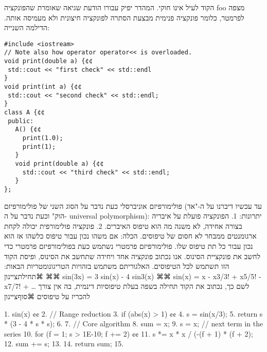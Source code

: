       הקוד לעיל אינו חוקי. המהדר יפיק עבורו הודעת שגיאה שאומרת שהפונקציה foo מצפה לפרמטר, כלומר פונקציה פנימית מבצעת הסתרה לפונקציה חיצונית ולא מעמיסה אותה.
      הדילמה השנייה:
\begin{verbatim}
#include <iostream>
// Note also how operator operator<< is overloaded.
void print(double a) {¢¢
 std::cout << "first check" << std::endl
}
void print(int a) {¢¢
 std::cout << "second check" << std::endl;
}
class A {¢¢
 public:
   A() {¢¢
     print(1.0);
     print(1);
   }
   void print(double a) {¢¢
     std::cout << "third check" << std::endl;
   }
};
\end{verbatim}

      פולימורפיזם אוניברסלי
      כעת נדבר על הסוג השני של פולימורפיזם (עד עכשיו דיברנו על ה-"אד הוק" וכעת נדבר על ה- universal polymorphism):
      יתרונות:
      1. הפונקציה פועלת על איבריה בצורה אחידה, לא משנה מה הוא טיפוס האיברים.
      2. פונקציה פולימורפית יכולה לקחת ארגומנטים ממבחר לא חסום של טיפוסים.
      הכלה:
      אם משהו נכון עבור טיפוס כלשהו אז הוא נכון עבור כל תת טיפוס שלו.
      פולימורפיזם פרמטרי
      נשתמש כעת בפולימורפיזם פרמטרי כדי לחשב את פונקציית הסינוס. אנו נכתוב פונקציה אחד ויחידה שתחשב את הסינוס, ופיסת הקוד הזו תשתמש לכל הטיפוסים. האלגוריתם משתמש בזהויות הטריגונומטריות הבאות:
      ⌘תחילת{ציינון}
      ⌘⌘ sin(3x) = 3 sin(x) - 4 sin3(x)
      ⌘⌘ sin(x) = x - x3/3! + x5/5! - x7/7! + …
      לשם כך, נכתוב את הקוד תחילה בשפה בעלת טיפוסיות דינמית, בה אין צורך להכריז על טיפוסים
  ⌘סוף{ציינון}

      1. sin(x) {¢¢
        2. // Range reduction
        3. if (abs(x) > 1) {¢¢
          4. s = sin(x/3);
          5. return s * (3 - 4 * s * s);
        6. }
        7. // Core algorithm
        8. sum = x;
        9. s = x; // next term in the series
        10. for (f = 1; s > 1E-10; f += 2) {¢¢
          11. s *= x * x / (-(f + 1) * (f + 2);
          12. sum += s;
        13. }
        14. return sum;
      15. }

